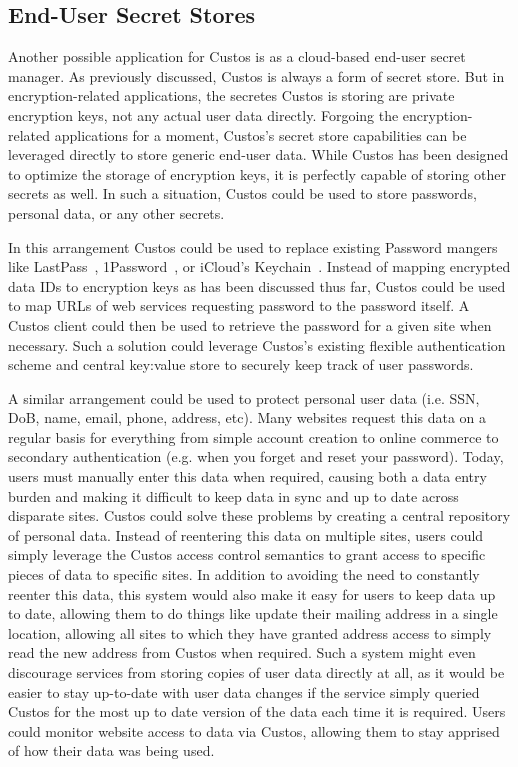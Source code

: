 \subsection{End-User Secret Stores}

Another possible application for Custos is as a cloud-based end-user
secret manager. As previously discussed, Custos is always a form of
secret store. But in encryption-related applications, the secretes
Custos is storing are private encryption keys, not any actual user
data directly. Forgoing the encryption-related applications for a
moment, Custos's secret store capabilities can be leveraged directly
to store generic end-user data. While Custos has been designed to
optimize the storage of encryption keys, it is perfectly capable of
storing other secrets as well. In such a situation, Custos could be
used to store passwords, personal data, or any other secrets.

In this arrangement Custos could be used to replace existing Password
mangers like LastPass~\cite{lastpass}, 1Password~\cite{onepassword},
or iCloud's Keychain~\cite{icloud}. Instead of mapping encrypted data
IDs to encryption keys as has been discussed thus far, Custos could be
used to map URLs of web services requesting password to the password
itself. A Custos client could then be used to retrieve the password
for a given site when necessary. Such a solution could leverage
Custos's existing flexible authentication scheme and central key:value
store to securely keep track of user passwords.

A similar arrangement could be used to protect personal user data
(i.e. SSN, DoB, name, email, phone, address, etc). Many websites
request this data on a regular basis for everything from simple
account creation to online commerce to secondary authentication
(e.g. when you forget and reset your password). Today, users must
manually enter this data when required, causing both a data entry
burden and making it difficult to keep data in sync and up to date
across disparate sites. Custos could solve these problems by creating
a central repository of personal data. Instead of reentering this data
on multiple sites, users could simply leverage the Custos access
control semantics to grant access to specific pieces of data to
specific sites. In addition to avoiding the need to constantly reenter
this data, this system would also make it easy for users to keep data
up to date, allowing them to do things like update their mailing
address in a single location, allowing all sites to which they have
granted address access to simply read the new address from Custos when
required. Such a system might even discourage services from storing
copies of user data directly at all, as it would be easier to stay
up-to-date with user data changes if the service simply queried Custos
for the most up to date version of the data each time it is
required. Users could monitor website access to data via Custos,
allowing them to stay apprised of how their data was being used.


